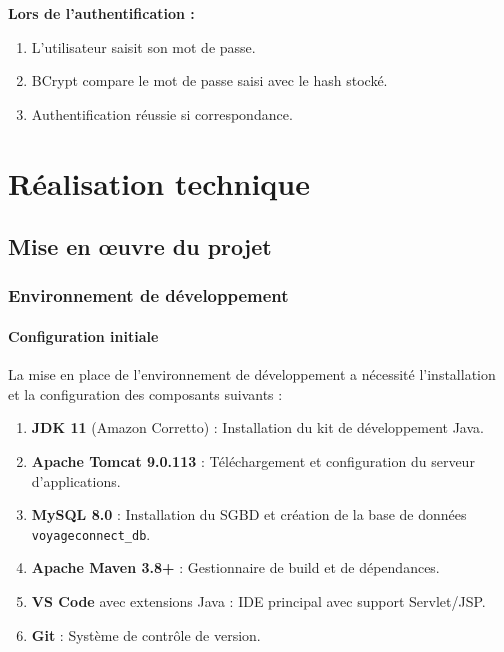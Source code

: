 \documentclass[12pt,a4paper]{report}
\begin{document}
\textbf{Lors de l'authentification :}
\begin{enumerate}
    \item L'utilisateur saisit son mot de passe.
    \item BCrypt compare le mot de passe saisi avec le hash stocké.
    \item Authentification réussie si correspondance.
\end{enumerate}


\chapter{Réalisation technique}

\section{Mise en œuvre du projet}

\subsection{Environnement de développement}

\subsubsection{Configuration initiale}

La mise en place de l'environnement de développement a nécessité l'installation et la configuration des composants suivants :

\begin{enumerate}
    \item \textbf{JDK 11} (Amazon Corretto) : Installation du kit de développement Java.
    \item \textbf{Apache Tomcat 9.0.113} : Téléchargement et configuration du serveur d'applications.
    \item \textbf{MySQL 8.0} : Installation du SGBD et création de la base de données \texttt{voyageconnect\_db}.
    \item \textbf{Apache Maven 3.8+} : Gestionnaire de build et de dépendances.
    \item \textbf{VS Code} avec extensions Java : IDE principal avec support Servlet/JSP.
    \item \textbf{Git} : Système de contrôle de version.
\end{enumerate}
\end{document}

